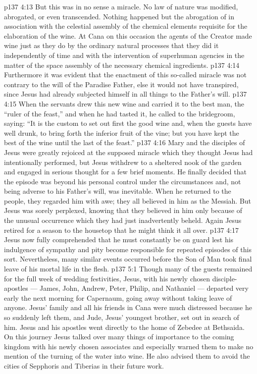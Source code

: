 \vs p137 4:13 But this was in no sense a miracle. No law of nature was modified, abrogated, or even transcended. Nothing happened but the abrogation of  in association with the celestial assembly of the chemical elements requisite for the elaboration of the wine. At Cana on this occasion the agents of the Creator made wine just as they do by the ordinary natural processes  that they did it independently of time and with the intervention of superhuman agencies in the matter of the space assembly of the necessary chemical ingredients.
\vs p137 4:14 Furthermore it was evident that the enactment of this so\hyp{}called miracle was not contrary to the will of the Paradise Father, else it would not have transpired, since Jesus had already subjected himself in all things to the Father’s will.
\vs p137 4:15 \pc When the servants drew this new wine and carried it to the best man, the “ruler of the feast,” and when he had tasted it, he called to the bridegroom, saying: “It is the custom to set out first the good wine and, when the guests have well drunk, to bring forth the inferior fruit of the vine; but you have kept the best of the wine until the last of the feast.”
\vs p137 4:16 Mary and the disciples of Jesus were greatly rejoiced at the supposed miracle which they thought Jesus had intentionally performed, but Jesus withdrew to a sheltered nook of the garden and engaged in serious thought for a few brief moments. He finally decided that the episode was beyond his personal control under the circumstances and, not being adverse to his Father’s will, was inevitable. When he returned to the people, they regarded him with awe; they all believed in him as the Messiah. But Jesus was sorely perplexed, knowing that they believed in him only because of the unusual occurrence which they had just inadvertently beheld. Again Jesus retired for a season to the housetop that he might think it all over.
\vs p137 4:17 Jesus now fully comprehended that he must constantly be on guard lest his indulgence of sympathy and pity become responsible for repeated episodes of this sort. Nevertheless, many similar events occurred before the Son of Man took final leave of his mortal life in the flesh.
\vs p137 5:1 Though many of the guests remained for the full week of wedding festivities, Jesus, with his newly chosen disciple\hyp{}apostles --- James, John, Andrew, Peter, Philip, and Nathaniel --- departed very early the next morning for Capernaum, going away without taking leave of anyone. Jesus’ family and all his friends in Cana were much distressed because he so suddenly left them, and Jude, Jesus’ youngest brother, set out in search of him. Jesus and his apostles went directly to the home of Zebedee at Bethsaida. On this journey Jesus talked over many things of importance to the coming kingdom with his newly chosen associates and especially warned them to make no mention of the turning of the water into wine. He also advised them to avoid the cities of Sepphoris and Tiberias in their future work.
